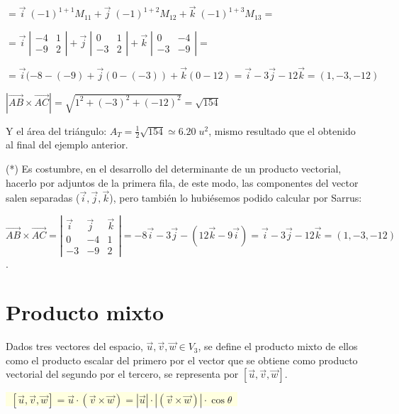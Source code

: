 \noindent $=\vec i \; (-1)^{1+1}M_{11}+\vec j \; (-1)^{1+2}M_{12}+\vec k \; (-1)^{1+3}M_{13}=$

\noindent $=\vec i \; \left| \begin{matrix} -4&1\\-9&2 \end{matrix} \right|  +\vec j \; \left| \begin{matrix} 0&1\\-3&2\end{matrix} \right| +\vec k \; \left| \begin{matrix} 0&-4\\-3&-9 \end{matrix} \right|=$

\noindent $=\vec i (-8-(-9)+\vec j (0-(-3))+\vec k (0-12)=\vec i - 3 \vec j - 12 \vec k =(1,-3,-12)$

\noindent $|\overrightarrow{AB} \times \overrightarrow{AC}|=\sqrt{1^2+(-3)^2+(-12)^2}=\sqrt{154}$

\noindent Y el área del triángulo: $A_T=\frac 1 2 \sqrt{154}\simeq 6.20\; u^2$, mismo resultado que el obtenido al final del ejemplo anterior.

\noindent (*) \textcolor{gris}{\small{Es costumbre, en el desarrollo del determinante de un producto vectorial, hacerlo por adjuntos de la primera fila, de este modo, las componentes del vector salen separadas ($\vec i, \vec j, \vec k$), pero también lo hubiésemos podido calcular por Sarrus:}} 

\noindent \textcolor{gris}{\footnotesize{$\overrightarrow{AB} \times \overrightarrow{AC}= \left| \begin{matrix}  \vec i & \vec j & \vec k \\0&-4&1\\-3&-9&2 \end{matrix} \right|= -8 \vec i -3\vec j -(12 \vec k-9 \vec i)=\vec i-3\vec j-12 \vec k=(1,-3,-12) $}\normalsize{.}}

\section{Producto mixto}

\begin{defi}

Dados tres vectores del espacio, $\vec u, \vec v, \vec w \in V_3$, se define el producto mixto de ellos como el producto escalar del primero por el vector que se obtiene como producto vectorial del segundo por el tercero, se representa por $[\vec u, \vec v, \vec w]$.

\vspace{2mm} \centerline{\colorbox{LightYellow}{$\; \boxed{\;[\vec u, \vec v, \vec w]=\vec u \cdot (\vec v \times \vec w)=|\vec u|\cdot|(\vec v \times \vec w)|\cdot \cos \theta\; }\;$}}

\end{defi}
\justify

